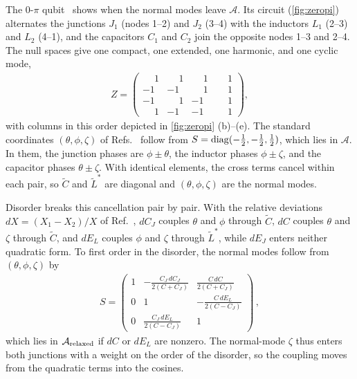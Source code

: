 The 0-$\pi$ qubit~\cite{brooks2013,Dempster2014understanding,groszkowski2018} shows when the normal modes leave $\mathcal A$.
Its circuit (\cref{fig:zeropi}) alternates the junctions $J_1$ (nodes 1--2) and $J_2$ (3--4) with the inductors $L_1$ (2--3) and $L_2$ (4--1), and the capacitors $C_1$ and $C_2$ join the opposite nodes 1--3 and 2--4.
The null spaces give one compact, one extended, one harmonic, and one cyclic mode,
\begin{align*}
    Z=\begin{pmatrix}
       \phantom{-}1 &\phantom{-}1 &\phantom{-}1 &\phantom{-}1\\
        -1 & -1 &\phantom{-}1 &\phantom{-}1\\
        -1 &\phantom{-}1 & -1 &\phantom{-}1\\
       \phantom{-}1 & -1 & -1 &\phantom{-}1
    \end{pmatrix},
\end{align*}
with columns in this order depicted in \cref{fig:zeropi} (b)--(e).
The standard coordinates $(\theta,\phi,\zeta)$ of Refs.~\cite{Dempster2014understanding,groszkowski2018} follow from $S={\rm diag}(-\tfrac12,-\tfrac12,\tfrac12)$, which lies in $\mathcal A$.
In them, the junction phases are $\phi\pm\theta$, the inductor phases $\phi\pm\zeta$, and the capacitor phases $\theta\pm\zeta$.
With identical elements, the cross terms cancel within each pair, so $\tilde C$ and $\tilde L^*$ are diagonal and $(\theta,\phi,\zeta)$ are the normal modes.

Disorder breaks this cancellation pair by pair.
With the relative deviations $dX=(X_1-X_2)/X$ of Ref.~\cite{groszkowski2018}, $dC_J$ couples $\theta$ and $\phi$ through $\tilde C$, $dC$ couples $\theta$ and $\zeta$ through $\tilde C$, and $dE_L$ couples $\phi$ and $\zeta$ through $\tilde L^*$, while $dE_J$ enters neither quadratic form.
To first order in the disorder, the normal modes follow from $(\theta,\phi,\zeta)$ by
\begin{align*}
    S=\begin{pmatrix}
        1 & -\frac{C_J\,dC_J}{2(C+C_J)} & \frac{C\,dC}{2(C+C_J)}\\
        0 & 1 & -\frac{C\,dE_L}{2(C-C_J)}\\
        0 & \frac{C_J\,dE_L}{2(C-C_J)} & 1
    \end{pmatrix} \, ,
\end{align*}
which lies in $\mathcal A_{\rm relaxed}$ if $dC$ or $dE_L$ are nonzero.
The normal-mode $\zeta$ thus enters both junctions with a weight on the order of the disorder, so the coupling moves from the quadratic terms into the cosines.

